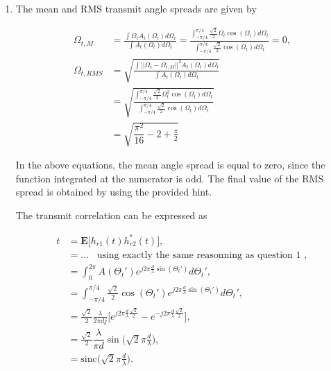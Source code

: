 \documentclass [a4paper, 11pt] {article}
\begin{document}
    \begin{solution}
        \begin{enumerate}
            \item The mean and RMS transmit angle spreads are given by

    \begin{align}
      \Omega_{t,M} &= \frac{\int\Omega_t A_t(\Omega_t) d\Omega_t}{\int A_t(\Omega_t) d\Omega_t}  = \frac{\int_{-\pi/4}^{\pi/4} \frac{\sqrt{2}}{2} \Omega_t \cos(\Omega_t) d\Omega_t}{\int_{-\pi/4}^{\pi/4} \frac{\sqrt{2}}{2} \cos(\Omega_t) d\Omega_t} = 0, \\
      \Omega_{t,RMS} &= \sqrt{\frac{\int \big| \big| \Omega_t - \Omega_{t,M} \big| \big|^2 A_t(\Omega_t) d\Omega_t}{\int A_t(\Omega_t) d\Omega_t}} \nonumber\\
      &= \sqrt{\frac{\int_{-\pi/4}^{\pi/4} \frac{\sqrt{2}}{2} \Omega_t^2 \cos(\Omega_t) d\Omega_t}{\int_{-\pi/4}^{\pi/4} \frac{\sqrt{2}}{2} \cos(\Omega_t) d\Omega_t}}\nonumber\\
      &= \sqrt{\dfrac{\pi^2}{16}-2+\frac{\pi}{2}}
    \end{align}
    
In the above equations, the mean angle spread is equal to zero, since the function integrated at the numerator is odd. The final value of the RMS spread is obtained by using the provided hint.

The transmit correlation can be expressed as 

\begin{align}
        t &= \mathbf{E}\Big[h_{r1}(t)h_{r2}^*(t) \Big], \\
        &= \hdots \; \; \; \text{using exactly the same reasonning as question 1 },\\
        &= \int_{0}^{2\pi} A(\Theta_t') e^{j2\pi\frac{d}{\lambda}\sin(\Theta_t')}  d\Theta_t', \\
        &= \int_{-\pi/4}^{\pi/4} \frac{\sqrt{2}}{2}\cos(\Theta_t') e^{j2\pi\frac{d}{\lambda}\sin(\Theta_t')}  d\Theta_t', \\
        &= \frac{\sqrt{2}}{2} \frac{\lambda}{2\pi d j}\Big[e^{j2\pi\frac{d}{\lambda}\frac{\sqrt{2}}{2}} - e^{-j2\pi\frac{d}{\lambda}\frac{\sqrt{2}}{2}}\Big], \\
        &= \frac{\sqrt{2}}{2}\dfrac{\lambda}{\pi d}\sin\bigg( \sqrt{2} \pi \frac{d}{\lambda} \bigg),\\
        &= \text{sinc}\bigg( \sqrt{2} \pi \frac{d}{\lambda} \bigg).
    \end{align}
        \end{enumerate}
    \end{solution}
   
\end{document}
